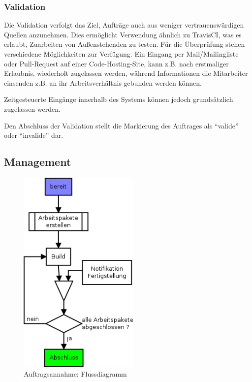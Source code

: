 \subsubsection{Validation}


Die Validation verfolgt das Ziel, Aufträge auch aus weniger vertrauenswürdigen Quellen anzunehmen.
Dies ermöglicht Verwendung ähnlich zu TravisCI, was es erlaubt, Zuarbeiten von Außenstehenden zu testen.
Für die Überprüfung stehen verschiedene Möglichkeiten zur Verfügung.
Ein Eingang per Mail/Mailingliste oder Pull-Request auf einer Code-Hosting-Site,
kann z.B. nach erstmaliger Erlaubnis, wiederholt zugelassen werden,
während Informationen die Mitarbeiter einsenden z.B. an ihr Arbeitsverhältnis gebunden werden können.

Zeitgesteuerte Eingänge innerhalb des Systems können jedoch grundsätzlich zugelassen werden.

Den Abschluss der Validation stellt die Markierung des Auftrages als ``valide'' oder ``invalide'' dar.

\subsection{Management}

\begin{figure}[ht] 
  \centering
  \includegraphics[height=4in]{imageinput/lebenszyklus-auftrag-abarbeitung.png}
  \caption{Auftragsannahme: Flussdiagramm}
  \label{fig:lebenszyklus-auftrag-abarbeitung}
\end{figure}

